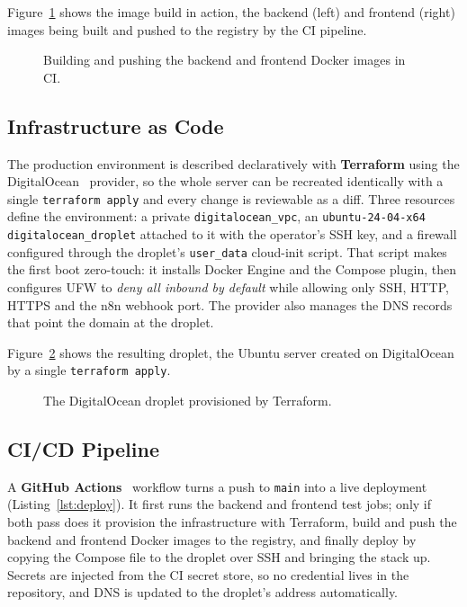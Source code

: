 Figure~\ref{fig:devops-docker} shows the image build in action, the
backend (left) and frontend (right) images being built and pushed to the
registry by the CI pipeline.

\begin{figure}[H]
  \centering
  \caption{Building and pushing the backend and frontend Docker images in CI.}
  \label{fig:devops-docker}
\end{figure}

\subsection{Infrastructure as Code}

The production environment is described declaratively with
\textbf{Terraform} using the DigitalOcean~\cite{digitalocean} provider, so the whole server
can be recreated identically with a single \texttt{terraform apply} and
every change is reviewable as a diff. Three resources define the
environment: a private \texttt{digitalocean\_vpc}, an
\texttt{ubuntu-24-04-x64} \texttt{digitalocean\_droplet} attached to it
with the operator's SSH key, and a firewall configured through the
droplet's \texttt{user\_data} cloud-init script. That script makes the
first boot zero-touch: it installs Docker Engine and the Compose plugin,
then configures UFW to \emph{deny all inbound by default} while allowing
only SSH, HTTP, HTTPS and the n8n webhook port. The provider also manages
the DNS records that point the domain at the droplet.

Figure~\ref{fig:devops-droplet} shows the resulting droplet, the
Ubuntu server created on DigitalOcean by a single \texttt{terraform apply}.

\begin{figure}[H]
  \centering
  \caption{The DigitalOcean droplet provisioned by Terraform.}
  \label{fig:devops-droplet}
\end{figure}

\subsection{CI/CD Pipeline}
\label{sec:cicd}

A \textbf{GitHub Actions}~\cite{githubactions} workflow turns a push to \texttt{main} into a
live deployment (Listing~\ref{lst:deploy}). It first runs the backend and
frontend test jobs; only if both pass does it provision the
infrastructure with Terraform, build and push the backend and frontend
Docker images to the registry, and finally deploy by copying the Compose
file to the droplet over SSH and bringing the stack up. Secrets are
injected from the CI secret store, so no credential lives in the
repository, and DNS is updated to the droplet's address automatically.

